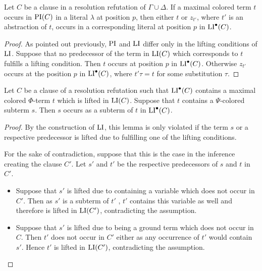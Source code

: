 \documentclass[%
	draft=false,%
	numbers=noendperiod,%
	11pt,%
	a4paper,%
	oneside,%
	openany,%
]{memoir}
\begin{document}
\begin{clemma}
	\label{lemma:pi_li_2}
	Let $C$ be a clause in a resolution refutation of $\Gamma \cup \Delta$.
	If a maximal colored term $t$ occurs in $\operatorname{PI}(C)$ in a literal $\lambda$ at position $p$, 
	then either $t$ or $z_{t'}$, where $t'$ is an abstraction of $t$, occurs in a corresponding literal at position $p$ in $\operatorname{LI}^\bullet(C)$.
\end{clemma}
\begin{proof}
	As pointed out previously, $\operatorname{PI}$ and $\operatorname{LI}$ differ only in the lifting conditions of $\operatorname{LI}$.
	Suppose that no predecessor of the term in $\operatorname{LI}(C)$ which corresponds to $t$  fulfills a lifting condition.
	Then $t$ occurs at position $p$ in $\operatorname{LI}^\bullet(C)$.
	Otherwise $z_{t'}$ occurs at the position $p$ in $\operatorname{LI}^\bullet(C)$, where $t'\tau = t$ for some substitution\nolinebreak{} $\tau$.
\end{proof}

\begin{clemma}
	\label{lemma:pi_li_3}
	Let $C$ be a clause of a resolution refutation such that $\operatorname{LI}^\bullet(C)$ contains a maximal colored $\Phi$-term $t$ which is lifted in $\operatorname{LI}(C)$. 
	Suppose that $t$ contains a $\Psi$-colored subterm $s$.
	Then $s$ occurs as a subterm of $t$ in $\operatorname{LI}^\bullet(C)$.
\end{clemma}
\begin{proof}
	By the construction of $\operatorname{LI}$, this lemma is only violated if the term $s$ or a respective predecessor is lifted due to fulfilling one of the lifting conditions.

	For the sake of contradiction, suppose that this is the case in the inference creating the clause $C'$. Let $s'$ and $t'$ be the respective predecessors of $s$ and $t$ in $C'$.
	\begin{itemize}
		\item 
			Suppose that $s'$ is lifted due to containing a variable which does not occur in $C'$.
			Then as $s'$ is a subterm of $t'$ , $t'$ contains this variable as well and therefore is lifted in $\operatorname{LI}(C')$, contradicting the assumption. 

		\item
			Suppose that $s'$ is lifted due to being a ground term which does not occur in $C$.
			Then $t'$ does not occur in $C'$ either as any occurrence of $t'$ would contain $s'$.
			Hence $t'$ is lifted in $\operatorname{LI}(C')$, contradicting the assumption.
			\qedhere
	\end{itemize}

\end{proof}
\end{document}
